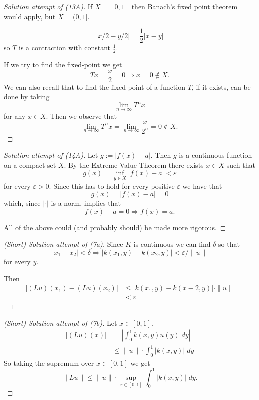 \begin{proof}[Solution attempt of (13A)]
    If $X = [0,1]$ then Banach's fixed point theorem would 
    apply, but $X = (0,1]$.

    \[
        |x/2 - y/2| = \frac{1}{2}|x - y|
    \]
    so $T$ is a contraction with constant $\frac{1}{2}$.

    If we try to find the fixed-point we get 
    \[
        Tx = \frac{x}{2} = 0 \Rightarrow x = 0 \not\in X.
    \]
    We can also recall that to find the fixed-point of 
    a function $T$, if it exists, can be done by taking 
    \[
        \lim_{n\to\infty} T^n x 
    \]
    for any $x \in X$. Then we observe that 
    \[
        \lim_{n\to\infty} T^n x = \lim_{n\to\infty} \frac{x}{2^n} 
        = 0 \not\in X.
    \]
\end{proof}

\begin{proof}[Solution attempt of (14A)]
    Let $g := |f(x) - a|$. Then $g$ is a continuous function 
    on a compact set $X$. 
    By the Extreme Value Theorem there exists $x \in X$ such 
    that 
    \[
        g(x) = \inf_{y \in X} |f(x) - a| < \varepsilon 
    \]
    for every $\varepsilon > 0$.
    Since this has to hold for every positive $\varepsilon$ we have 
    that 
    \[
        g(x) = |f(x) - a| = 0 
    \]
    which, since $|\cdot|$ is a norm, implies that 
    \[
        f(x) - a = 0 \Rightarrow f(x) = a.
    \]

    All of the above could (and probably should) 
    be made more rigorous. 
\end{proof}

\begin{proof}[(Short) Solution attempt of (7a)]
    Since $K$ is continuous we can find $\delta$ so that 
    \[
        |x_1 - x_2| < \delta 
        \Rightarrow |k(x_1, y) - k(x_2, y)|  
        < \varepsilon / \|u\|
    \]
    for every $y$.

    Then 
    \begin{align*}
        |(Lu)(x_1) - (Lu)(x_2)| 
        & \leq |k(x_1, y) - k(x-2, y)| \cdot 
        \|u\|  \\ 
        &< \varepsilon
    \end{align*}
\end{proof}

\begin{proof}[(Short) Solution attempt of (7b)]
    Let $x \in [0,1]$.
    \begin{align*}
        |(Lu)(x)| 
        &= |\int_0^1 k(x,y)u(y) \; dy| \\ 
        &\leq \|u\| \cdot \int_0^1 |k(x,y)| \; dy
    \end{align*}
    So taking the supremum over $x \in [0,1]$ we get 
    \[
        \|Lu\| \leq \|u\| \cdot \sup_{x\in[0,1]} \int_0^1 
        |k(x,y)| \; dy.
    \]
\end{proof}

